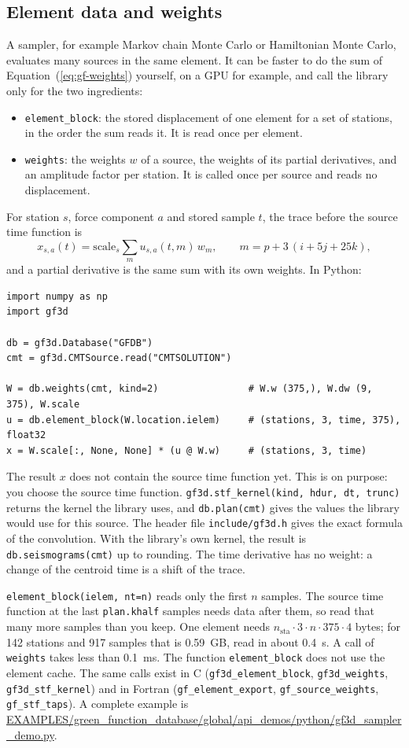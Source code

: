 \subsection{Element data and weights}\label{sec:gf-weights-api}

A sampler, for example Markov chain Monte Carlo or Hamiltonian Monte Carlo,
evaluates many sources in the same element. It can be faster to do the sum of
Equation~(\ref{eq:gf-weights}) yourself, on a GPU for example, and call the
library only for the two ingredients:
\begin{itemize}
\item \texttt{element\_block}: the stored displacement of one element for a set
  of stations, in the order the sum reads it. It is read once per element.
\item \texttt{weights}: the weights $w$ of a source, the weights of its partial
  derivatives, and an amplitude factor per station. It is called once per
  source and reads no displacement.
\end{itemize}
For station $s$, force component $a$ and stored sample $t$, the trace before
the source time function is
\begin{equation}
x_{s,a}(t) = \mathrm{scale}_s \sum_{m} u_{s,a}(t,m)\, w_m,
\qquad m = p + 3\,(i + 5j + 25k),
\end{equation}
and a partial derivative is the same sum with its own weights. In Python:
\begin{verbatim}
import numpy as np
import gf3d

db = gf3d.Database("GFDB")
cmt = gf3d.CMTSource.read("CMTSOLUTION")

W = db.weights(cmt, kind=2)                # W.w (375,), W.dw (9, 375), W.scale
u = db.element_block(W.location.ielem)     # (stations, 3, time, 375), float32
x = W.scale[:, None, None] * (u @ W.w)     # (stations, 3, time)
\end{verbatim}
The result $x$ does not contain the source time function yet. This is on
purpose: you choose the source time function. \texttt{gf3d.stf\_kernel(kind,
hdur, dt, trunc)} returns the kernel the library uses, and \texttt{db.plan(cmt)}
gives the values the library would use for this source. The header file
\texttt{include/gf3d.h} gives the exact formula of the convolution. With the
library's own kernel, the result is \texttt{db.seismograms(cmt)} up to
rounding. The time derivative has no weight: a change of the centroid time is
a shift of the trace.

\texttt{element\_block(ielem, nt=n)} reads only the first $n$ samples. The
source time function at the last \texttt{plan.khalf} samples needs data after
them, so read that many more samples than you keep. One element needs
$n_{\mathrm{sta}}\cdot 3\cdot n\cdot 375\cdot 4$ bytes; for 142 stations and
917 samples that is 0.59~GB, read in about 0.4~s. A call of \texttt{weights}
takes less than 0.1~ms. The function \texttt{element\_block} does not use the
element cache. The same calls exist in C (\texttt{gf3d\_element\_block},
\texttt{gf3d\_weights}, \texttt{gf3d\_stf\_kernel}) and in Fortran
(\texttt{gf\_element\_export}, \texttt{gf\_source\_weights},
\texttt{gf\_stf\_taps}). A complete example is
\url{EXAMPLES/green_function_database/global/api_demos/python/gf3d_sampler_demo.py}.


